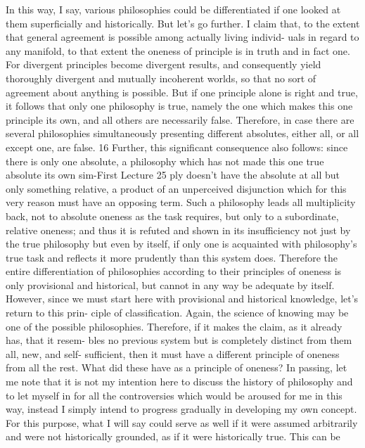 In this way, I say, various philosophies could be differentiated if one
looked at them superficially and historically. But let’s go further. I claim that,
to the extent that general agreement is possible among actually living individ-
uals in regard to any manifold, to that extent the oneness of principle is in
truth and in fact one. For divergent principles become divergent results, and
consequently yield thoroughly divergent and mutually incoherent worlds, so
that no sort of agreement about anything is possible. But if one principle alone
is right and true, it follows that only one philosophy is true, namely the one
which makes this one principle its own, and all others are necessarily false.
Therefore, in case there are several philosophies simultaneously presenting
different absolutes, either all, or all except one, are false. 16
Further, this significant consequence also follows: since there is only one
absolute, a philosophy which has not made this one true absolute its own sim-First Lecture
25
ply doesn’t have the absolute at all but only something relative, a product of
an unperceived disjunction which for this very reason must have an opposing
term. Such a philosophy leads all multiplicity back, not to absolute oneness as
the task requires, but only to a subordinate, relative oneness; and thus it is
refuted and shown in its insufficiency not just by the true philosophy but even
by itself, if only one is acquainted with philosophy’s true task and reflects it
more prudently than this system does. Therefore the entire differentiation of
philosophies according to their principles of oneness is only provisional and
historical, but cannot in any way be adequate by itself. However, since we must
start here with provisional and historical knowledge, let’s return to this prin-
ciple of classification. Again, the science of knowing may be one of the possible
philosophies. Therefore, if it makes the claim, as it already has, that it resem-
bles no previous system but is completely distinct from them all, new, and self-
sufficient, then it must have a different principle of oneness from all the rest.
What did these have as a principle of oneness? In passing, let me note that it
is not my intention here to discuss the history of philosophy and to let myself
in for all the controversies which would be aroused for me in this way, instead
I simply intend to progress gradually in developing my own concept. For this
purpose, what I will say could serve as well if it were assumed arbitrarily and
were not historically grounded, as if it were historically true. This can be

